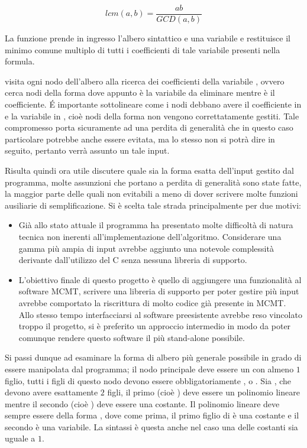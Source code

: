 \documentclass[11pt,letterpaper,twoside]{article}
\begin{document}
$$lcm(a, b) = \frac{a b}{GCD(a, b)}$$

La funzione  prende in ingresso l'albero sintattico e una
variabile e restituisce il minimo comune multiplo di tutti i coefficienti di
tale variabile presenti nella formula.


 visita ogni nodo dell'albero alla ricerca dei coefficienti della
variabile , ovvero cerca nodi della forma  dove
appunto  è la variabile da eliminare mentre  è il
coefficiente. \'E importante sottolineare come i nodi debbano avere il
coefficiente in  e la variabile in , cioè
nodi della forma  non vengono correttatamente gestiti.
Tale compromesso porta sicuramente ad una perdita di generalità che in questo
caso particolare potrebbe anche essere evitata, ma lo stesso non si potrà dire
in seguito, pertanto verrà assunto un tale input.

Risulta quindi ora utile discutere quale sia la forma esatta dell'input gestito
dal programma, molte assunzioni che portano a perdita di generalità sono state
fatte, la maggior parte delle quali non evitabili a meno di dover scrivere molte
funzioni ausiliarie di semplificazione. Si è scelta tale strada principalmente
per due motivi:

\begin{itemize}
  \item Già allo stato attuale il programma ha presentato molte difficoltà di
    natura tecnica non inerenti all'implementazione dell'algoritmo. Considerare
    una gamma più ampia di input avrebbe aggiunto una notevole complessità
    derivante dall'utilizzo del C senza nessuna libreria di supporto.
  \item L'obiettivo finale di questo progetto è quello di aggiungere una
    funzionalità al software MCMT\autocite{mcmt}, scrivere una libreria di
    supporto per poter gestire più input avrebbe comportato la riscrittura di
    molto codice già presente in MCMT. Allo stesso tempo interfacciarsi al
    software preesistente avrebbe reso vincolato troppo il progetto, si è
    preferito un approccio intermedio in modo da poter comunque rendere questo
    software il più stand-alone possibile.
\end{itemize}

Si passi dunque ad esaminare la forma di albero più generale possibile in grado
di essere manipolata dal programma; il nodo principale deve essere un
 con almeno $1$ figlio, tutti i figli di questo nodo devono essere
obbligatoriamente \inline{=}, \inline{>} o .
Sia \inline{=}, \inline{>} che  devono avere esattamente $2$ figli,
il primo (cioè ) deve essere un polinomio lineare mentre il
secondo (cioè ) deve essere una costante. Il polinomio lineare
deve sempre essere della forma , dove come prima, il primo figlio di \inline{*} è una costante e il
secondo è una variabile. La sintassi è questa anche nel caso una delle
costanti sia uguale a $1$.
\end{document}
